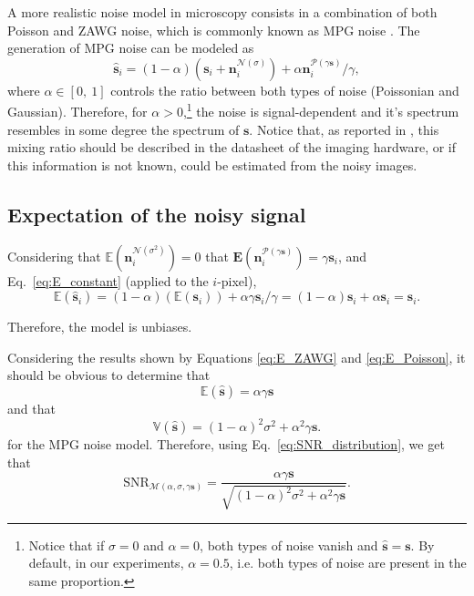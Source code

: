 A more realistic noise model in microscopy consists in a combination
of both Poisson and \gls{ZAWG} noise, which is commonly known as
\gls{MPG} noise \cite{meiniel2018denoising}. The generation of
\gls{MPG} noise can be modeled as
\begin{equation}
  \hat{\mathbf{s}}_i = (1-\alpha)(\mathbf{s}_i + \mathbf{n}^{\mathcal{N}(\sigma)}_i) + \alpha\mathbf{n}^{\mathcal{P}(\gamma\mathbf{s})}_i/\gamma,
  \label{eq:MPG_noise_model} 
\end{equation}
where $\alpha\in[0,~1]$ controls the ratio between both types of noise
(Poissonian and Gaussian). Therefore, for
$\alpha > 0$,\footnote{Notice that if $\sigma=0$ and $\alpha=0$, both
  types of noise vanish and $\hat{\mathbf{s}}=\mathbf{s}$. By default,
  in our experiments, $\alpha=0.5$, i.e. both types of noise are
  present in the same proportion.} the noise is signal-dependent and
it's spectrum resembles in some degree the spectrum of
$\mathbf{s}$. Notice that, as reported in \cite{foi2008practical},
this mixing ratio should be described in the datasheet of the imaging
hardware, or if this information is not known, could be estimated from the
noisy images.

\subsection{Expectation of the noisy signal}
Considering that $\mathbb{E}(\mathbf{n}^{\mathcal{N}(\sigma^2)}_i)=0$
that
$\mathbf{E}(\mathbf{n}^{\mathcal{P}(\gamma\mathbf{s})}_i)=\gamma\mathbf{s}_i$, and Eq.~\ref{eq:E_constant} (applied to the $i$-pixel),
\begin{equation}
  \mathbb{E}(\hat{\mathbf{s}}_i) = (1-\alpha)(\mathbb{E}(\mathbf{s}_i)) + \alpha\gamma\mathbf{s}_i/\gamma = (1-\alpha)\mathbf{s}_i + \alpha\mathbf{s}_i = \mathbf{s}_i.
\end{equation}

Therefore, the model is unbiases.

Considering the results shown by Equations \ref{eq:E_ZAWG} and
\ref{eq:E_Poisson}, it should be obvious to determine that
\begin{equation}
  \mathbb{E}(\hat{\mathbf{s}}) = \alpha\gamma\mathbf{s}
  \label{eq:E_MPG}
\end{equation}
and that
\begin{equation}
  \mathbb{V}(\hat{\mathbf{s}}) = (1-\alpha)^2\sigma^2 + \alpha^2\gamma\mathbf{s}.
  \label{eq:V_MPG}
\end{equation}
for the \gls{MPG} noise model. Therefore, using 
Eq.~\ref{eq:SNR_distribution}, we get that
\begin{equation}
  \text{SNR}_{\mathcal{M}(\alpha,\sigma,\gamma\mathbf{s})} = \frac{\alpha\gamma\mathbf{s}}{\sqrt{(1-\alpha)^2\sigma^2 + \alpha^2\gamma\mathbf{s}}}.
\end{equation}

